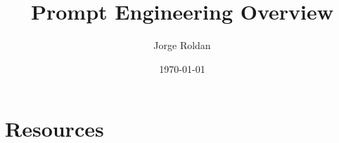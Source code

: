\documentclass[9pt]{article}
\title{Prompt Engineering Overview}
\author{Jorge Roldan}
\date{\today}
\begin{document}
\maketitle
\tableofcontents
\newpage

\section{Resources}
\end{document}
